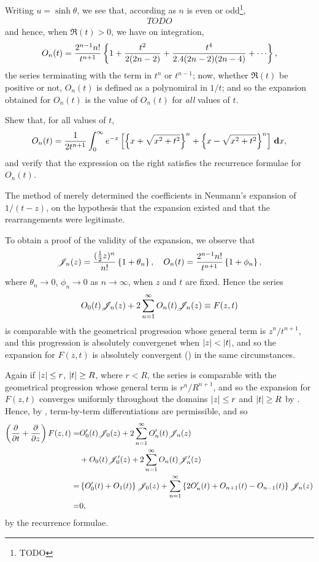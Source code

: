 Writing $u = \sinh \theta$, we see that, according as $n$ is even or
odd\footnote{TODO},
\begin{align*}
  TODO
\end{align*}
and hence, when $\Re(t) > 0$, we have on integration,
$$
O_{n}(t)
=
\frac{2^{n-1} n!}{t^{n+1}}
\thebrace{
  1
  + \frac{t^{2}}{2 (2n-2)}
  + \frac{t^{4}}{ 2.4 (2n-2)(2n-4)}
  + \cdots
},
$$
the series terminating with the term in $t^{n}$ or $t^{n-1}$; now,
whether $\Re(t)$ be positive or not,
$O_{n}(t)$ is defined as a polynomiral in $1/t$; and so the expansion
obtained for $O_{n}(t)$ is the value of $O_{n}(t)$ for \emph{all} values
of $t$.
\begin{wandwexample}
  Shew that, for all values of $t$,
  $$
  O_{n}(t)
  =
  \frac{1}{2 t^{n+1}}
  \int_{0}^{\infty}
  e^{-x}
  \left[ 
    \left\{ x + \sqrt{x^{2} + t^{2}} \right\}^{n}
    +
    \left\{ x - \sqrt{x^{2} + t^{2}} \right\}^{n}
   \right]
  \, \mathbf{d} x,
  $$
  and verify that the expression on the right satisfies the recurrence
  formulae for $O_{n}(t)$.
\end{wandwexample}
The method of  merely determined the
coefficients in Neumann's expansion of $1/(t-z)$, on the hypothesis
that the expansion existed and that the rearrangements were
legitimate.

To obtain a proof of the validity of the expansion, we observe that
$$
\mathscr{J}_{n}(z)
=
\frac{(\frac{1}{2} z)^{n}}{n!}
\left\{ 1 + \theta_{n} \right\},
\quad
O_{n}(t)
=
\frac{2^{n-1} n!}{t^{n+1}}
\left\{  1 + \phi_{n} \right\},
$$
%
%
where $\theta_{n} \rightarrow 0$, $\phi_{n} \rightarrow 0$ as $n
\rightarrow \infty$, when $z$ and $t$ are fixed. Hence the series
$$
O_{0}(t) \mathscr{J}_{n}(z)
+
2
\sum_{n=1}^{\infty}
O_{n}(t) \mathscr{J}_{n}(z)
\equiv
F(z,t)
$$
is comparable with the geometrical progression whose general term is
$z^{n} / t^{n+1}$, and this progression is absolutely convergenet when
$\left| z \right| < \left| t \right|$, and so the expansion for $F(z,t)$ is
absolutely convergent () in the same
circumstances.

Again if $\left| z \right| \leq r$, $\left| t \right| \geq R$, where $r < R$, the
series is comparable with the geometrical progression whose general
term is $r^{n} / R^{n+1}$, and so the expansion for $F(z,t)$ converges
uniformly throughout the domains $\left| z \right| \leq r$ and $\left| t \right|
\geq R$ by . Hence, by
, term-by-term differentiations are permissible,
and so
\begin{align*}
  \left(  \frac{\partial}{\partial t} + \frac{\partial}{\partial z}
   \right)
  F(z,t)
  =&
  O_{0}'(t) \mathscr{J}_{0}(z)
  + 2 \sum_{n=1}^{\infty} O_{n}'(t) \mathscr{J}_{n}(z)
  \\
  &
  + O_{0}(t) \mathscr{J}'_{0}(z)
  + 2 \sum_{n=1}^{\infty}
  O_{n}(t) \mathscr{J}'_{n}(z)
  \\
  =&
  \left\{  O_{0}'(t) + O_{1}(t) \right\} \mathscr{J}_{0}(z)
  + \sum_{n=1}^{\infty} \left\{ 
    2 O_{n}'(t) + O_{n+1}(t) - O_{n-1}(t)
   \right\}
  \mathscr{J}_{n}(z)
  \\
  =&
  0,
\end{align*}
by the recurrence formulae.

